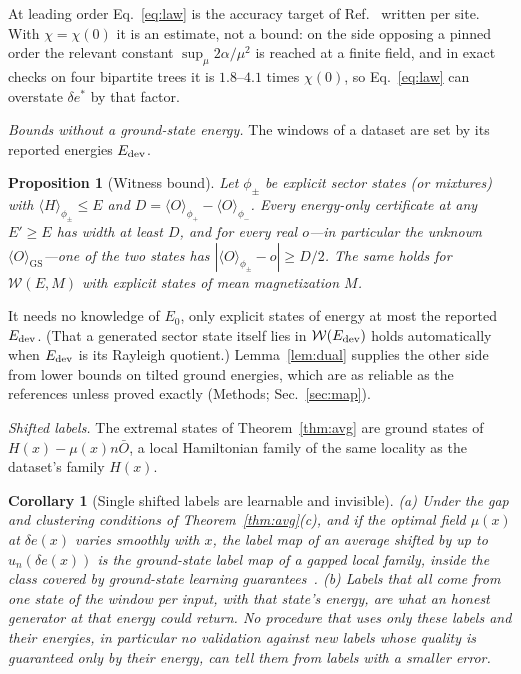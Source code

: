 \documentclass[aps,prx,twocolumn,10pt,superscriptaddress,nofootinbib,longbibliography,floatfix]{revtex4-2}
\newtheorem{proposition}{Proposition}
\newtheorem{corollary}{Corollary}
\theoremstyle{remark}
\newcommand{\de}{\delta e}
\newcommand{\des}{\delta e^{*}}
\newcommand{\W}{\mathcal{W}}
\newcommand{\GS}{\mathrm{GS}}
\begin{document}
At leading order Eq.~\eqref{eq:law} is the accuracy target of Ref.~\cite{manchanda2026} written per site. With
$\chi=\chi(0)$ it is an estimate, not a bound: on the side opposing a pinned order the relevant constant
$\sup_\mu2\alpha/\mu^2$ is reached at a finite field, and in exact checks on four bipartite trees it is $1.8$--$4.1$ %
times $\chi(0)$, so Eq.~\eqref{eq:law} can overstate $\des$ by that factor.

\emph{Bounds without a ground-state energy.} The windows of a dataset are set by its reported energies $E_{\rm dev}$.

\begin{proposition}[Witness bound]
\label{prop:W}
Let $\phi_\pm$ be explicit sector states (or mixtures) with $\langle H\rangle_{\phi_\pm}\le E$ and
$D=\langle O\rangle_{\phi_+}-\langle O\rangle_{\phi_-}$. Every energy-only certificate at any $E'\ge E$ has width at
least $D$, and for every real $o$---in particular the unknown $\langle O\rangle_\GS$---one of the two states has
$|\langle O\rangle_{\phi_\pm}-o|\ge D/2$. The same holds for $\W(E,M)$ with explicit states of mean magnetization
$M$.
\end{proposition}

It needs no knowledge of $E_0$, only explicit states of energy at most the
reported $E_{\rm dev}$. (That a generated sector state itself lies in $\W(E_{\rm dev})$ holds automatically when
$E_{\rm dev}$ is its Rayleigh quotient.) Lemma~\ref{lem:dual} supplies the other side from lower bounds on tilted
ground energies, which are as reliable as the references unless proved exactly (Methods; Sec.~\ref{sec:map}).

\emph{Shifted labels.} The extremal states of Theorem~\ref{thm:avg} are ground states of $H(x)-\mu(x)n\bar O$, a
local Hamiltonian family of the same locality as the dataset's family $H(x)$.

\begin{corollary}[Single shifted labels are learnable and invisible]
\label{cor:learn}
(a) Under the gap and clustering conditions of Theorem~\ref{thm:avg}(c), and if the optimal field $\mu(x)$ at $\de(x)$ varies smoothly
with $x$, the label map of an average shifted by up to $u_n(\de(x))$ is the ground-state label map of a gapped local
family, inside the class covered by ground-state learning guarantees~\cite{huang2022,lewis2024,wanner2024}.
(b) Labels that all come from one state of the window per input, with that state's energy, are what an honest
generator at that energy could return. No procedure that uses only these labels and their energies, in particular no
validation against new labels whose quality is guaranteed only by their energy, can tell them from labels with a
smaller error.
\end{corollary}
\end{document}

